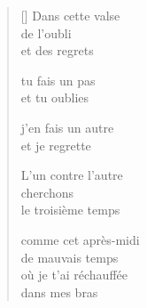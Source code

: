 \documentclass[11pt,a4paper]{article}
\begin{document}
\thispagestyle{empty}


\settowidth{\versewidth}{où je t'ai réchauffée}

\bigskip

\begin{verse}[\versewidth]
  Dans cette valse \\
  de l'oubli \\
  et des regrets

  tu fais un pas \\
  et tu oublies

  j'en fais un autre \\
  et je regrette

  L'un contre l'autre \\
  cherchons \\
  le troisième temps

  comme cet après-midi \\
  de mauvais temps \\
  où je t'ai réchauffée \\
  dans mes bras
\end{verse}
\end{document}
